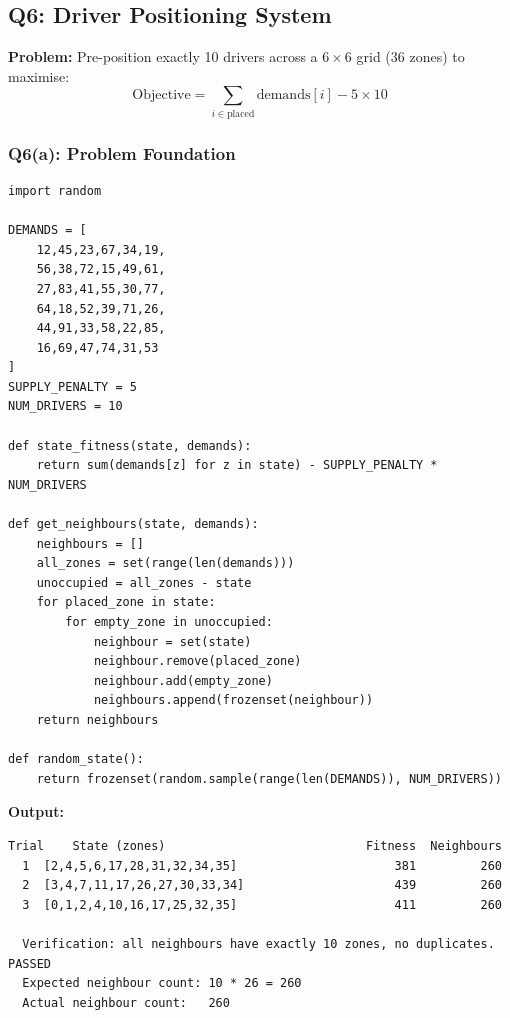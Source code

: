 \documentclass[12pt,a4paper]{article}
\begin{document}
\subsection{Q6: Driver Positioning System}

\textbf{Problem:} Pre-position exactly 10 drivers across a $6 \times 6$ grid
(36 zones) to maximise:
\[
\text{Objective} = \sum_{i \in \text{placed}} \text{demands}[i] - 5 \times 10
\]

\subsubsection*{Q6(a): Problem Foundation}

\begin{lstlisting}[style=pycode, caption={Q6(a): Foundation functions}]
import random

DEMANDS = [
    12,45,23,67,34,19,
    56,38,72,15,49,61,
    27,83,41,55,30,77,
    64,18,52,39,71,26,
    44,91,33,58,22,85,
    16,69,47,74,31,53
]
SUPPLY_PENALTY = 5
NUM_DRIVERS = 10

def state_fitness(state, demands):
    return sum(demands[z] for z in state) - SUPPLY_PENALTY * NUM_DRIVERS

def get_neighbours(state, demands):
    neighbours = []
    all_zones = set(range(len(demands)))
    unoccupied = all_zones - state
    for placed_zone in state:
        for empty_zone in unoccupied:
            neighbour = set(state)
            neighbour.remove(placed_zone)
            neighbour.add(empty_zone)
            neighbours.append(frozenset(neighbour))
    return neighbours

def random_state():
    return frozenset(random.sample(range(len(DEMANDS)), NUM_DRIVERS))
\end{lstlisting}

\textbf{Output:}

\begin{lstlisting}[style=output]
  Trial    State (zones)                            Fitness  Neighbours
  1  [2,4,5,6,17,28,31,32,34,35]                      381         260
  2  [3,4,7,11,17,26,27,30,33,34]                     439         260
  3  [0,1,2,4,10,16,17,25,32,35]                      411         260

  Verification: all neighbours have exactly 10 zones, no duplicates. PASSED
  Expected neighbour count: 10 * 26 = 260
  Actual neighbour count:   260
\end{lstlisting}
\end{document}
